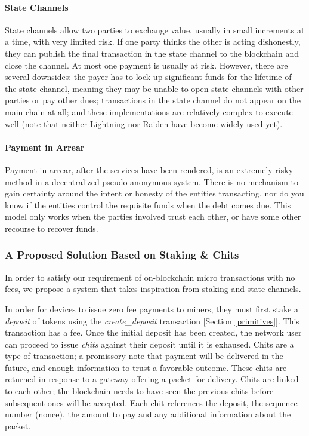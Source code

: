 \documentclass[10pt, nonatbib, nocopyrightspace, reprint]{sigplanconf}
\begin{document}
\paragraph{State Channels}
State channels \cite{state-channels} allow two parties to exchange value, usually in small increments at a time, with very limited risk. If one party thinks the other is acting dishonestly, they can publish the final transaction in the state channel to the blockchain and close the channel. At most one payment is usually at risk. However, there are several downsides: the payer has to lock up significant funds for the lifetime of the state channel, meaning they may be unable to open state channels with other parties or pay other dues; transactions in the state channel do not appear on the main chain at all; and these implementations are relatively complex to execute well (note that neither Lightning \cite{lightning} nor Raiden \cite{raiden} have become widely used yet).

\paragraph{Payment in Arrear}
Payment in arrear, after the services have been rendered, is an extremely risky method in a decentralized pseudo-anonymous system. There is no mechanism to gain certainty around the intent or honesty of the entities transacting, nor do you know if the entities control the requisite funds when the debt comes due. This model only works when the parties involved trust each other, or have some other recourse to recover funds.

\subsubsection{A Proposed Solution Based on Staking \& Chits}

In order to satisfy our requirement of on-blockchain micro transactions with no fees, we propose a system that takes inspiration from staking and state channels.

In order for devices to issue zero fee payments to miners, they must first stake a \emph{deposit} of tokens using the \emph{create\_deposit} transaction [Section \ref{primitives}]. This transaction has a fee. Once the initial deposit has been created, the network user can proceed to issue \emph{chits} against their deposit until it is exhaused. Chits are a type of transaction; a promissory note that payment will be delivered in the future, and enough information to trust a favorable outcome. These chits are returned in response to a gateway offering a packet for delivery. Chits are linked to each other; the blockchain needs to have seen the previous chits before subsequent ones will be accepted. Each chit references the deposit, the sequence number (nonce), the amount to pay and any additional information about the packet.
\end{document}
